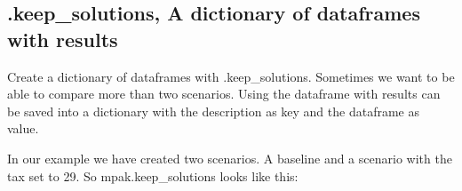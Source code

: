\documentclass[letterpaper,10pt,english]{jupyterBook}
\begin{document}
\subsection{.keep\_solutions, A dictionary of dataframes with results}
\label{\detokenize{content/Python/modelflow_features:keep-solutions-a-dictionary-of-dataframes-with-results}}
\sphinxAtStartPar
Create a dictionary of dataframes with .keep\_solutions. Sometimes we want to be able to compare more than two scenarios. Using  the dataframe with results can be saved into a dictionary with the description as key and the dataframe as value.

\sphinxAtStartPar
In our example we have created two scenarios. A baseline and a scenario with the tax set to 29. So mpak.keep\_solutions looks like this:
\end{document}
